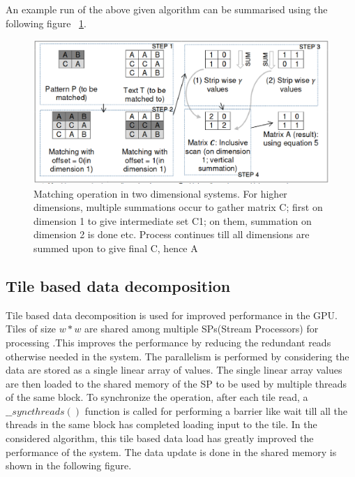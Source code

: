 \documentclass[graybox]{svmult}
\begin{document}
An example run of the above given algorithm can be summarised using the following figure ~\ref{fig:1}.
\begin{figure}
\sidecaption
\includegraphics[scale=.50]{workingsys.eps}
%
%
\caption{Matching operation in two dimensional systems. For higher dimensions, multiple summations occur to gather matrix C; first on dimension 1 to give intermediate set C1; on them, summation on dimension 2 is done etc. Process continues till all dimensions are summed upon to give final C, hence A}
\label{fig:1}       %
\end{figure}


\subsection{Tile based data decomposition}
\label{subsec:3}
Tile based data decomposition is used for improved performance in the GPU. Tiles of size $w*w$ are shared among multiple SPs(Stream Processors) for processing .This improves the performance by reducing the redundant reads otherwise needed in the system. The parallelism is performed by considering the data are stored as a single linear array of values. The single linear array values are then loaded to the shared memory of the SP to be used by multiple threads of the same block. To synchronize the operation, after each tile read, a $\_\_syncthreads()$ function is called for performing a barrier like wait till all the threads in the same block has completed loading input to the tile. In the considered algorithm, this tile based data load has greatly improved the performance of the system. The data update is done in the shared memory is shown in the following figure.
\end{document}
